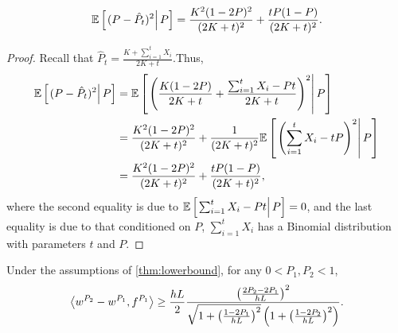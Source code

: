 \begin{lemma}
	\label{lem:bayeserror}
	\[
	\mathbb{E}\left[ \left. (P-\hat{P}_t)^2 \right| P \right] = \frac{K^2(1-2P)^2}{(2K+t)^2} + \frac{tP(1-P)}{(2K+t)^2}.
	\]
\end{lemma}
\begin{proof}
	Recall that $\hat P_t = \frac{K+\sum_{i=1}^{t}X_i}{2K+t}$.Thus, 
	\begin{align*}
	\mathbb{E}\left[ \left. (P-\hat{P}_t)^2 \right| P \right] & = \mathbb{E}\left[ \left. \left(\frac{K(1-2P)}{2K+t} + \frac{\sum_{i=1}^{t}X_i- Pt}{2K+t}\right)^2 \right| P \right] \\
	& = \frac{K^2(1-2P)^2}{(2K+t)^2} + \frac{1}{(2K+t)^2}\mathbb{E}\left[ \left.  \left(\sum_{i=1}^{t}X_i - tP\right)^2 \right| P \right] \\
	& = \frac{K^2(1-2P)^2}{(2K+t)^2} + \frac{tP(1-P)}{(2K+t)^2},
	\end{align*}
	where the second equality is due to $\mathbb{E}\left[ \left.  \sum_{i=1}^{t}X_i - Pt \right| P \right] =0$, and the last equality is due to that conditioned on $P$, $\sum_{i=1}^{t}X_i$ has a Binomial distribution with parameters $t$ and $P$.
\end{proof}
\begin{lemma} Under the assumptions of \cref{thm:lowerbound}, for any $0<P_1,P_2<1$,
	\label{lem:P2P1loss}
	\[
	\left\langle w^{P_2} - w^{P_1}, f^{P_1}\right\rangle \ge \frac{hL}{2} \frac{\left( \frac{2P_2 - 2P_1}{hL} \right)^2}{\sqrt{1+\left( \frac{1-2P_1}{hL}\right)^2 } \left(1+\left( \frac{1-2P_2}{hL}\right)^2 \right)}.
	\]
\end{lemma}
